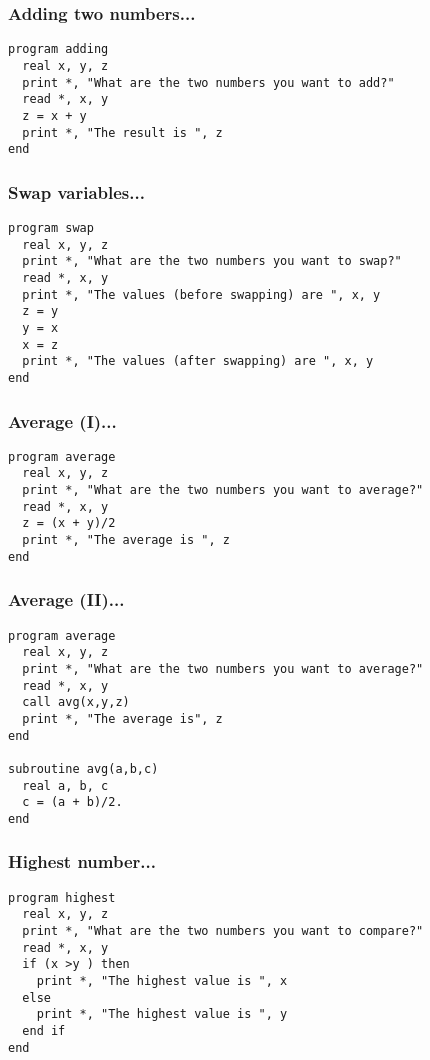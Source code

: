\documentclass[xcolor=dvipsnames,dvip,notes=show,table]{beamer}
\begin{document}
\begin{frame}[fragile]
\frametitle{Adding two numbers...}
\scriptsize
\begin{lstlisting}
program adding
  real x, y, z
  print *, "What are the two numbers you want to add?"
  read *, x, y  
  z = x + y
  print *, "The result is ", z
end
\end{lstlisting}
\end{frame}



\begin{frame}[fragile]
\frametitle{Swap variables...}

\scriptsize
\begin{lstlisting}
program swap
  real x, y, z
  print *, "What are the two numbers you want to swap?"
  read *, x, y
  print *, "The values (before swapping) are ", x, y
  z = y
  y = x
  x = z
  print *, "The values (after swapping) are ", x, y
end
\end{lstlisting}
\end{frame}


\begin{frame}[fragile]
\frametitle{Average (I)...}

\scriptsize
\begin{lstlisting}
program average
  real x, y, z
  print *, "What are the two numbers you want to average?"
  read *, x, y
  z = (x + y)/2
  print *, "The average is ", z
end
\end{lstlisting}
\end{frame}


\begin{frame}[fragile]
\frametitle{Average (II)...}

\scriptsize
\begin{lstlisting}
program average
  real x, y, z
  print *, "What are the two numbers you want to average?"
  read *, x, y
  call avg(x,y,z)
  print *, "The average is", z
end
 
subroutine avg(a,b,c)
  real a, b, c
  c = (a + b)/2.
end
\end{lstlisting}
\end{frame}


\begin{frame}[fragile]
\frametitle{Highest number...}

\scriptsize
\begin{lstlisting}
program highest
  real x, y, z
  print *, "What are the two numbers you want to compare?"
  read *, x, y
  if (x >y ) then 
    print *, "The highest value is ", x
  else 
    print *, "The highest value is ", y
  end if
end
\end{lstlisting}
\end{frame}
\end{document}
